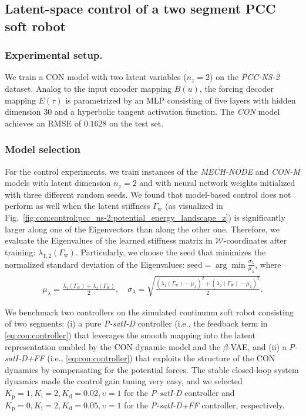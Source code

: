 \subsection{Latent-space control of a two segment PCC soft robot}

\subsubsection{Experimental setup.}
We train a \gls{CON} model with two latent variables ($n_z = 2$) on the \emph{PCC-NS-2} dataset.
Analog to the input encoder mapping $B(u)$, the forcing decoder mapping $E(\tau)$ is parametrized by an \gls{MLP} consisting of five layers with hidden dimension $30$ and a hyperbolic tangent activation function.
The \emph{CON} model achieves an \gls{RMSE} of $0.1628$ on the test set.
\subsubsection{Model selection}
For the control experiments, we train instances of the \emph{MECH-NODE} and \emph{CON-M} models with latent dimension $n_z = 2$ and with neural network weights initialized with three different random seeds. 
We found that model-based control does not perform as well when the latent stiffness $\Gamma_\mathrm{w}$ (as visualized in Fig.~\ref{fig:con:control:pcc_ns-2:potential_energy_landscape_z}) is significantly larger along one of the Eigenvectors than along the other one. Therefore, we evaluate the Eigenvalues of the learned stiffness matrix in $\mathcal{W}$-coordinates after training: $\lambda_{1,2}(\Gamma_\mathrm{w})$. Particularly, we choose the seed that minimizes the normalized standard deviation of the Eigenvalues: $\mathrm{seed} = \arg\min \frac{\sigma_\lambda}{\mu_\lambda}$, where
\begin{equation}
\begin{split}
    \mu_\lambda = \frac{\lambda_1(\Gamma_\mathrm{w}) + \lambda_2(\Gamma_\mathrm{w})}{2},
    \quad
    \sigma_\lambda = \sqrt{\frac{(\lambda_1(\Gamma_\mathrm{w})-\mu_\lambda)^2 + (\lambda_2(\Gamma_\mathrm{w})-\mu_\lambda)^2}{2}}.
\end{split}
\end{equation}


We benchmark two controllers on the simulated continuum soft robot consisting of two segments: (i) a pure \emph{P-satI-D} controller (i.e., the feedback term in \eqref{eq:con:controller}) that leverages the smooth mapping into the latent representation enabled by the \gls{CON} dynamic model and the $\beta$-\gls{VAE}, and (ii) a \emph{P-satI-D+FF} (i.e., \eqref{eq:con:controller}) that exploits the structure of the \gls{CON} dynamics by compensating for the potential forces.
The stable closed-loop system dynamics made the control gain tuning very easy, and we selected $K_\mathrm{p} = 1, K_\mathrm{i}=2, K_\mathrm{d} = 0.02, \upsilon = 1$ for the \emph{P-satI-D} controller and $K_\mathrm{p} = 0, K_\mathrm{i}=2, K_\mathrm{d} = 0.05, \upsilon = 1$ for the \emph{P-satI-D+FF} controller, respectively.

